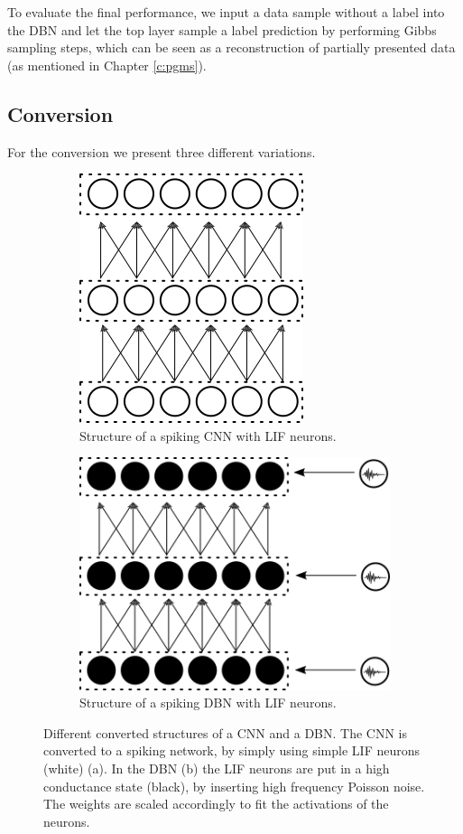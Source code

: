 To evaluate the final performance, we input a data sample without a label into the DBN and let the top layer sample a label prediction by performing Gibbs sampling steps, which can be seen as a reconstruction of partially presented data (as mentioned in Chapter \ref{c:pgms}).


\subsection{Conversion} \label{c:conversionappr}

For the conversion we present three different variations.

\begin{figure}
	\centering
	\begin{subfigure}[t]{.5\textwidth}
  		\centering
  		\includegraphics[width=.6\linewidth]{imgs/convert_cnn.png}
  		\caption{Structure of a spiking CNN with LIF neurons.}
  		\label{fig:converted1}
	\end{subfigure}%
	\begin{subfigure}[t]{.5\textwidth}
  		\centering
  		\includegraphics[width=.8\linewidth]{imgs/convert_dbn.png}
  		\caption{Structure of a spiking DBN with LIF neurons.}
  		\label{fig:converted2}
  	\end{subfigure}
	\caption{Different converted structures of a CNN and a DBN. The CNN is converted to a spiking network, by simply using simple LIF neurons (white) (a). In the DBN (b) the LIF neurons are put in a high conductance state (black), by inserting high frequency Poisson noise. The weights are scaled accordingly to fit the activations of the neurons.}
	\label{fig:converted}
\end{figure}


